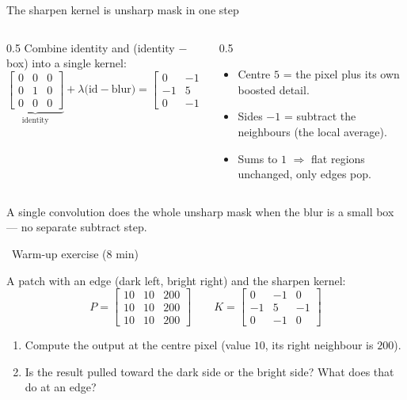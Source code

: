 \documentclass[10pt,aspectratio=169]{beamer}
\begin{document}
\begin{frame}{The sharpen kernel is unsharp mask in one step}
  \begin{columns}[T]
    \begin{column}{0.5\textwidth}
      Combine identity and (identity $-$ box) into a single kernel:
      \[
      \underbrace{\begin{bmatrix}0&0&0\\0&1&0\\0&0&0\end{bmatrix}}_{\text{identity}}
      +\lambda\Big(\text{id}-\text{blur}\Big)
      =\begin{bmatrix}0&-1&0\\-1&5&-1\\0&-1&0\end{bmatrix}
      \]
    \end{column}
    \begin{column}{0.5\textwidth}
      \begin{itemize}
        \item Centre $5$ = the pixel plus its own boosted detail.
        \item Sides $-1$ = subtract the neighbours (the local average).
        \item Sums to $1$ $\Rightarrow$ flat regions unchanged, only edges pop.
      \end{itemize}
    \end{column}
  \end{columns}
  \begin{infobox}
    A single convolution does the whole unsharp mask when the blur is a small box — no separate subtract step.
  \end{infobox}
\end{frame}

\begin{frame}[fragile]{\faPen~Warm-up exercise (8 min)}
  \begin{infobox}
  \end{infobox}
  A patch with an edge (dark left, bright right) and the sharpen kernel:
  \[
  P=\begin{bmatrix}10&10&200\\10&10&200\\10&10&200\end{bmatrix}\qquad
  K=\begin{bmatrix}0&-1&0\\-1&5&-1\\0&-1&0\end{bmatrix}
  \]
  \begin{enumerate}
    \item Compute the output at the centre pixel (value $10$, its right neighbour is $200$).
    \item Is the result pulled toward the dark side or the bright side? What does that do at an edge?
  \end{enumerate}
\end{frame}
\end{document}
